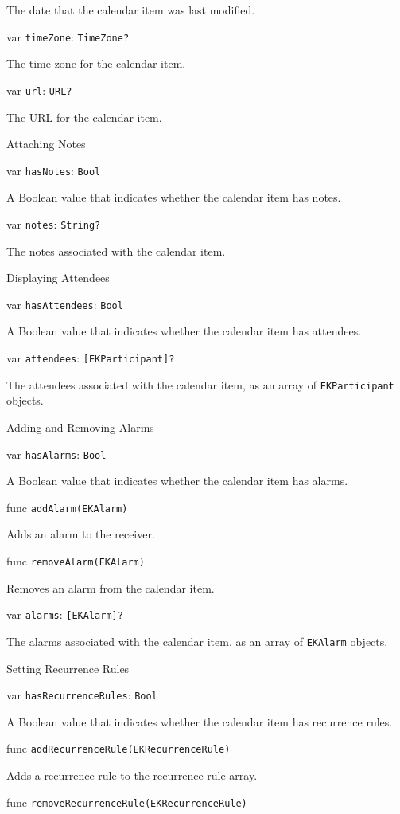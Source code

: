 \documentclass{article}
\begin{document}
The date that the calendar item was last modified.

var \texttt{timeZone}: \texttt{TimeZone?}

The time zone for the calendar item.

var \texttt{url}: \texttt{URL?}

The URL for the calendar item.

Attaching Notes

var \texttt{hasNotes}: \texttt{Bool}

A Boolean value that indicates whether the calendar item has notes.

var \texttt{notes}: \texttt{String?}

The notes associated with the calendar item.

Displaying Attendees

var \texttt{hasAttendees}: \texttt{Bool}

A Boolean value that indicates whether the calendar item has attendees.

var \texttt{attendees}: \texttt{[EKParticipant]?}

The attendees associated with the calendar item, as an array of \texttt{EKParticipant} objects.

Adding and Removing Alarms

var \texttt{hasAlarms}: \texttt{Bool}

A Boolean value that indicates whether the calendar item has alarms.

func \texttt{addAlarm(EKAlarm)}

Adds an alarm to the receiver.

func \texttt{removeAlarm(EKAlarm)}

Removes an alarm from the calendar item.

var \texttt{alarms}: \texttt{[EKAlarm]?}

The alarms associated with the calendar item, as an array of \texttt{EKAlarm} objects.

Setting Recurrence Rules

var \texttt{hasRecurrenceRules}: \texttt{Bool}

A Boolean value that indicates whether the calendar item has recurrence rules.

func \texttt{addRecurrenceRule(EKRecurrenceRule)}

Adds a recurrence rule to the recurrence rule array.

func \texttt{removeRecurrenceRule(EKRecurrenceRule)}
\end{document}
